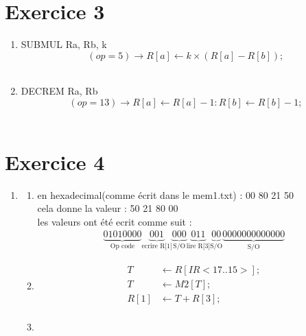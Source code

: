\documentclass{article}
\begin{document}
\newpage
\section*{Exercice 3}
\begin{enumerate}
	\item SUBMUL Ra, Rb, k \\
	      \[(op = 5) \rightarrow	R[a]  \leftarrow k \times (R[a] - R[b]);\] \\
	\item DECREM Ra, Rb \\
	      \[(op = 13) \rightarrow R[a] \leftarrow R[a]- 1: R[b] \leftarrow R[b] -1;\] \\
\end{enumerate}


\newpage
\section*{Exercice 4}
\begin{enumerate}
	\item
	      \begin{enumerate}[label=\alph*)]
	      	\item en hexadecimal(comme \'ecrit dans le mem1.txt) : 00 80 21 50 \\
	      	      cela donne la valeur : 50 21 80 00\\
	      	      les valeurs ont \'et\'e ecrit comme suit :
	      	      \begin{align*}
	      	      	\underbrace{0101 0000}_{\text{Op code}}
	      	      	\underbrace{001}_{\text{ecrire R[1]}}
	      	      	\underbrace{000}_{\text{S/O}}
	      	      	\underbrace{011}_{\text{lire R[3]}}
	      	      	\underbrace{00}_{\text{S/O}}
	      	      	\underbrace{0 0000 0000 0000}_{\text{S/O}}
	      	      \end{align*}
	      	\item
	      	      \begin{align*}
	      	      	T    & \leftarrow R[IR<17..15>]; \\
	      	      	T    & \leftarrow M2[T];         \\
	      	      	R[1] & \leftarrow T + R[3];      \\
	      	      \end{align*}
	      	\item
	      \end{enumerate}
\end{enumerate}
\end{document}
